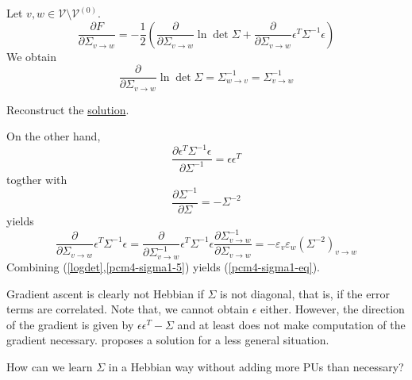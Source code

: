 \documentclass[a4paper,11pt]{article}
\begin{document}
\begin{Bew} Let $v,w\in\mathcal{V}\setminus\mathcal{V}^{(0)}$.
\begin{equation}\label{pcm4-sigma1-1}
\frac{\partial F}{\partial\Sigma_{v\to w}}=-\frac12\left(\frac{\partial}{\partial\Sigma_{v\to w}}\ln\det\Sigma+\frac{\partial}{\partial\Sigma_{v\to w}}\epsilon^T\Sigma^{-1}\epsilon\right)
\end{equation}
We obtain 
\begin{equation}\label{logdet}
\frac{\partial}{\partial\Sigma_{v\to w}}\ln\det\Sigma=\Sigma^{-1}_{w\to v}=\Sigma^{-1}_{v\to w}
\end{equation}
\begin{OP}
Reconstruct the \hyperlink{https://math.stackexchange.com/questions/38701/how-to-calculate-the-gradient-of-log-det-matrix-inverse}{solution}.
\end{OP}
On the other hand, 
\begin{equation}\label{pcm4-sigma1-2}
\frac{\partial\epsilon^T\Sigma^{-1}\epsilon}{\partial\Sigma^{-1}}=\epsilon\epsilon^T
\end{equation}
togther with
\begin{equation}\label{pcm4-sigma1-3}
\frac{\partial\Sigma^{-1}}{\partial\Sigma}=-\Sigma^{-2}
\end{equation}
yields
\begin{equation}\label{pcm4-sigma1-5}
\frac{\partial}{\partial\Sigma_{v\to w}}\epsilon^T\Sigma^{-1}\epsilon=\frac{\partial}{\partial\Sigma_{v\to w}^{-1}}\epsilon^T\Sigma^{-1}\epsilon\frac{\partial\Sigma_{v\to w}^{-1}}{\partial\Sigma_{v\to w}}=-\varepsilon_v\varepsilon_w\left(\Sigma^{-2}\right)_{v\to w}
\end{equation}
Combining (\ref{logdet},\ref{pcm4-sigma1-5}) yields (\ref{pcm4-sigma1-eq}).
\end{Bew}
\begin{Abs}
Gradient ascent is clearly not Hebbian if $\Sigma$ is not diagonal, that is, if the error terms are correlated. Note that, we cannot obtain $\epsilon$ either. However, the direction of the gradient is given by $\epsilon\epsilon^T-\Sigma$ and at least does not make computation of the gradient necessary. \cite{Bogacz2017} proposes a solution for a less general situation.
\begin{OP}
How can we learn $\Sigma$ in a Hebbian way without adding more PUs than necessary?
\end{OP}
\end{Abs}
\printbibliography
\end{document}
